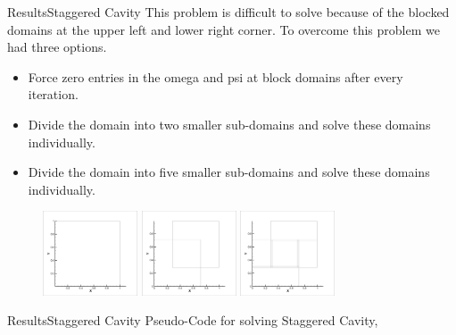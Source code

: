 \documentclass[11pt]{beamer}
\begin{document}
\begin{frame}{Results}{Staggered Cavity}
This problem is difficult to solve because of the blocked domains at the upper left and lower right corner. To overcome this problem we had three options.
\begin{itemize}
\item  Force zero entries in the omega and psi at block domains after every iteration.
\item  Divide the domain into two smaller sub-domains and solve these domains individually.
\item  Divide the domain into five smaller sub-domains and solve these domains individually.
\end{itemize}
\begin{figure}[H]
\includegraphics[width=0.25\textwidth]{images/stagerred/one}
\includegraphics[width=0.25\textwidth]{images/stagerred/two}
\includegraphics[width=0.25\textwidth]{images/stagerred/three}
\end{figure}
\end{frame}

\begin{frame}{Results}{Staggered Cavity}
Pseudo-Code for solving Staggered Cavity,\\
\lstI
\end{frame}
\end{document}
